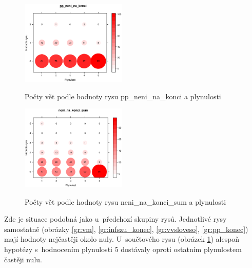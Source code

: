 \documentclass[12pt,a4paper]{report}
\begin{document}
\begin{figure}[!htb]
\begin{center}
  \centering\includegraphics[width=50mm]{./grafy/rysy/pp_neni_na_konci-c.eps}
  \caption{Počty vět podle hodnoty rysu pp\_neni\_na\_konci a plynulosti}\label{gr:pp_konec}
\endminipage\quad
{} 
  \centering\includegraphics[width=50mm]{./grafy/rysy/neni_na_konci_sum-c.eps}
  \caption{Počty vět podle hodnoty rysu neni\_na\_konci\_sum a plynulosti}\label{gr:sumneni}
\endminipage
\end{center}
\end{figure}


Zde je situace podobná jako u~předchozí skupiny rysů. Jednotlivé rysy samostatně (obrázky \ref{gr:vm}, \ref{gr:infszu_konec}, \ref{gr:vvsloveso}, \ref{gr:pp_konec}) mají hodnoty nejčastěji okolo nuly. U~součtového rysu (obrázek \ref{gr:sumneni}) alespoň hypotézy s~hodnocením plynulosti 5 dostávaly oproti ostatním plynulostem častěji nulu.
\end{document}
